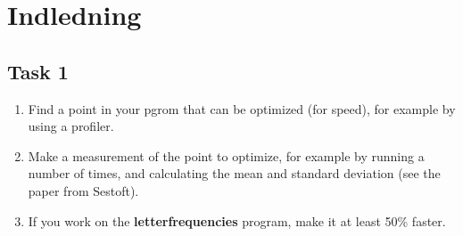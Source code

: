 \documentclass[class=report, crop=false]{standalone}
\begin{document}
    \section{Indledning}
    \subsection*{Task 1}
    \begin{enumerate}
        \item Find a point in your pgrom that can be optimized (for speed), for example by using a profiler.
        \item Make a measurement of the point to optimize, for example by running a number of times, and calculating the mean and standard deviation (see the paper from Sestoft).
        \item If you work on the \textbf{letterfrequencies} program, make it at least 50\% faster.
    \end{enumerate}
\end{document}
